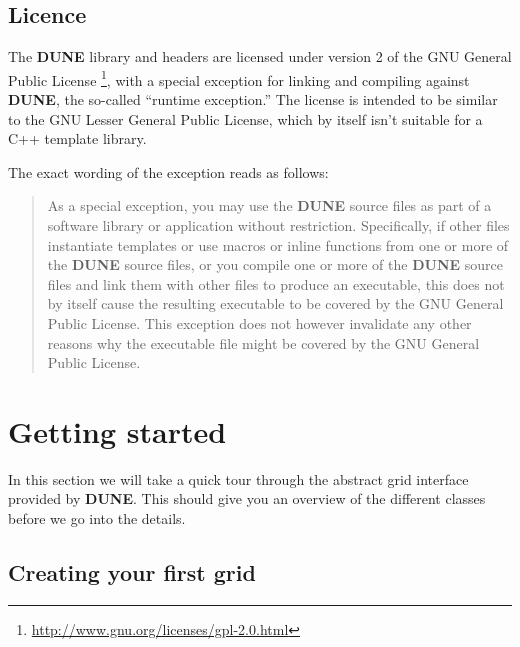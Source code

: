 \documentclass[11pt,a4paper,headinclude,footinclude,DIV16,headings=normal]{scrreprt}
\newcommand{\Dune}{{\sffamily\bfseries DUNE}\xspace}
\begin{document}
\section{Licence}

The \Dune{} library and headers are licensed under version 2 of the
GNU General Public License%
\footnote{\url{http://www.gnu.org/licenses/gpl-2.0.html}}, with a special
exception for linking and compiling against \Dune{}, the so-called
``runtime exception.''  The license is intended to be similar to the
GNU Lesser General Public License, which by itself isn't suitable for
a C++ template library.

The exact wording of the exception reads as follows:

\begin{quote}
   As a special exception, you may use the \Dune{} source files as part
   of a software library or application without restriction.
   Specifically, if other files instantiate templates or use macros or
   inline functions from one or more of the \Dune{} source files, or you
   compile one or more of the \Dune{} source files and link them with
   other files to produce an executable, this does not by itself cause
   the resulting executable to be covered by the GNU General Public
   License.  This exception does not however invalidate any other
   reasons why the executable file might be covered by the GNU General
   Public License.
\end{quote}





\chapter{Getting started}

In this section we will take a quick tour through the abstract
grid interface provided by \Dune. This should give you an overview of
the different classes before we go into the details.

\section{Creating your first grid}
\end{document}
